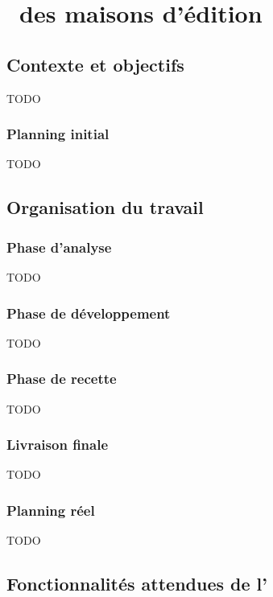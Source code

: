 \section{\aintranet\ des maisons d'édition \aey}

\subsection{Contexte et objectifs}

TODO

\subsubsection{Planning initial}

TODO

\subsection{Organisation du travail}

\subsubsection{Phase d'analyse}

TODO

\subsubsection{Phase de développement}

TODO

\subsubsection{Phase de recette}

TODO

\subsubsection{Livraison finale}

TODO

\subsubsection{Planning réel}

TODO

\subsection{Fonctionnalités attendues de l'\aintranet}

